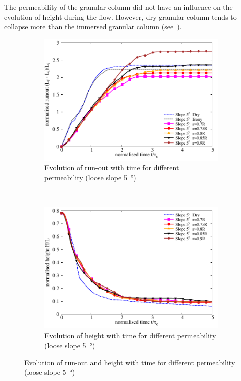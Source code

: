 The permeability of the granular column did not have an influence on the evolution of height during the flow. However, dry granular column tends to collapse more than the immersed granular column (see~).

\begin{figure}
\centering
\begin{subfigure}[b]{0.95\textwidth}
\centering
\includegraphics[width=0.95\columnwidth]{Runout_loose_5_slope}
\caption{Evolution of run-out with time for different permeability (loose slope \SI{5}{\degree})}
\label{fig:run5}
\end{subfigure}\\
\begin{subfigure}[b]{0.95\textwidth}
\centering
\includegraphics[width=0.95\columnwidth]{Height_loose_5_slope}
\caption{Evolution of height with time for different permeability (loose slope \SI{5}{\degree})}
\label{fig:height5}
\end{subfigure}
\caption{Evolution of run-out and height with time for different permeability 
(loose slope \SI{5}{\degree})}
\label{fig:height_run_5}
\end{figure}

